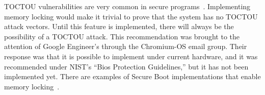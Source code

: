 TOCTOU vulnerabilities are very common in secure programs~\cite{tpm-toctou}.
Implementing memory locking would make it trivial to prove that the system has
no TOCTOU attack vectors. 
Until this feature is implemented, there will always be the possibility of a
TOCTOU attack.
This recommendation was brought to the attention of Google Engineer's through
the Chromium-OS email group.
Their response was that it is possible to implement under current hardware, and
it was recommended under NIST's ``Bios Protection Guidelines,'' but it has not
been implemented yet.
There are examples of Secure Boot implementations that enable memory locking~\cite{elane}.

% 
